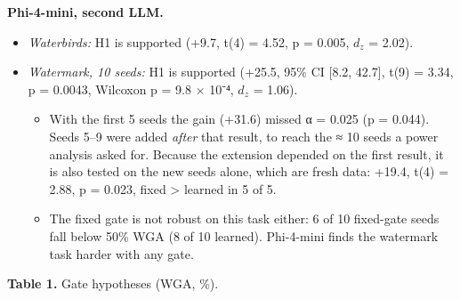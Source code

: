 \textbf{Phi-4-mini, second LLM.}

\begin{itemize}
\item
  \emph{Waterbirds:} H1 is supported (+9.7, t(4) = 4.52, p = 0.005, \(d_z\) = 2.02).
\item
  \emph{Watermark, 10 seeds:} H1 is supported (+25.5, 95\% CI {[}8.2, 42.7{]}, t(9) = 3.34, p = 0.0043,
  Wilcoxon p = 9.8 × 10⁻⁴, \(d_z\) = 1.06).

  \begin{itemize}
  \item
    With the first 5 seeds the gain (+31.6) missed α = 0.025 (p = 0.044). Seeds 5--9 were added \emph{after} that
    result, to reach the ≈ 10 seeds a power analysis asked for. Because the extension depended on the first
    result, it is also tested on the new seeds alone, which are fresh data: +19.4, t(4) = 2.88, p = 0.023,
    fixed \textgreater{} learned in 5 of 5.
  \item
    The fixed gate is not robust on this task either: 6 of 10 fixed-gate seeds fall below 50\% WGA (8 of 10
    learned). Phi-4-mini finds the watermark task harder with any gate.
  \end{itemize}
\end{itemize}

\textbf{Table 1.} Gate hypotheses (WGA, \%).

